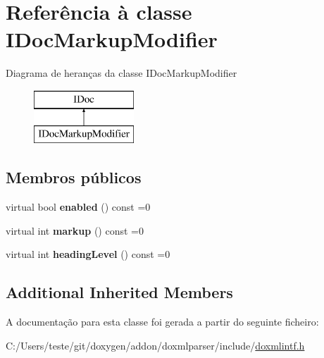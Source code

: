 \hypertarget{class_i_doc_markup_modifier}{\section{Referência à classe I\-Doc\-Markup\-Modifier}
\label{class_i_doc_markup_modifier}
}
Diagrama de heranças da classe I\-Doc\-Markup\-Modifier\begin{figure}[H]
\begin{center}
\leavevmode
\includegraphics[height=2.000000cm]{class_i_doc_markup_modifier}
\end{center}
\end{figure}
\subsection*{Membros públicos}
\begin{DoxyCompactItemize}
\item 
\hypertarget{class_i_doc_markup_modifier_ac90e60f81a12700b6f94e534d625ba25}{virtual bool {\bfseries enabled} () const =0}\label{class_i_doc_markup_modifier_ac90e60f81a12700b6f94e534d625ba25}

\item 
\hypertarget{class_i_doc_markup_modifier_a4edbcfbfc6c605d6a13e127989409892}{virtual int {\bfseries markup} () const =0}\label{class_i_doc_markup_modifier_a4edbcfbfc6c605d6a13e127989409892}

\item 
\hypertarget{class_i_doc_markup_modifier_af2be1503cf9bf69306401b7d8023605b}{virtual int {\bfseries heading\-Level} () const =0}\label{class_i_doc_markup_modifier_af2be1503cf9bf69306401b7d8023605b}

\end{DoxyCompactItemize}
\subsection*{Additional Inherited Members}


A documentação para esta classe foi gerada a partir do seguinte ficheiro\-:\begin{DoxyCompactItemize}
\item 
C\-:/\-Users/teste/git/doxygen/addon/doxmlparser/include/\hyperlink{include_2doxmlintf_8h}{doxmlintf.\-h}\end{DoxyCompactItemize}
